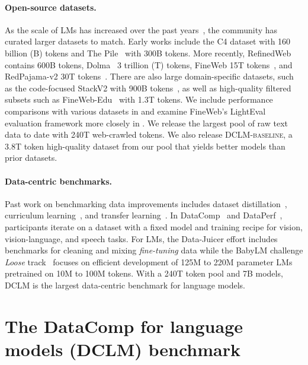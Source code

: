 \documentclass{article}
\newcommand{\smallsec}[1]{\paragraph{#1}}
\newcommand{\dclm}{\textsc{DCLM}\xspace}
\newcommand{\hqpool}{\textsc{DCLM-baseline}\xspace}
\newcommand{\numpooltokens}{240T\xspace}
\begin{document}
\smallsec{Open-source datasets.} As the scale of LMs has increased over the past years~\citep{llama,llama2,llama3,Chowdhery2022PaLMSL,chinchilla,gpt4,gopher,gemmateam2024gemma}, the community has curated larger datasets to match.
Early works include the C4 dataset with 160 billion (B) tokens and The Pile~\citep{pile} with 300B tokens.
More recently, RefinedWeb~\citep{refinedweb} contains 600B tokens, Dolma~\citep{soldaini2024dolma} 3 trillion (T) tokens, FineWeb 15T tokens~\citep{penedo2024fineweb}, and RedPajama-v2 30T tokens~\citep{rpjv2}.
There are also large domain-specific datasets, such as the code-focused StackV2 with 900B tokens~\citep{lozhkov2024starcoder}, as well as high-quality filtered subsets such as FineWeb-Edu~\citep{lozhkov2024fineweb-edu} with 1.3T tokens.
We include performance comparisons with various datasets in  and examine FineWeb's LightEval evaluation framework more closely in .
We release the largest pool of raw text data to date with \numpooltokens web-crawled tokens.
We also release \hqpool, a 3.8T token high-quality dataset from our pool that yields better models than prior datasets.

\smallsec{Data-centric benchmarks.} Past work on benchmarking data improvements includes dataset distillation~\citep{cui2022dcbench}, curriculum learning~\citep{pmlr-v139-romac21a}, and transfer learning~\citep{albalak-etal-2022-feta,pmlr-v162-bugliarello22a}. In DataComp~\citep{gadre2024datacomp} and DataPerf~\citep{dataperf}, participants iterate on a dataset with a fixed model and training recipe for vision, vision-language, and speech tasks. For LMs, the Data-Juicer \citep{datajuicer2023} effort includes benchmarks for cleaning and mixing \textit{fine-tuning} data while the BabyLM challenge \emph{Loose} track~\citep{warstadt-etal-2023-findings} focuses on efficient development of 125M to 220M parameter LMs pretrained on 10M to 100M tokens.
With a 240T token pool and 7B models, \dclm is the largest data-centric benchmark for language models.

\section{The DataComp for language models (\dclm) benchmark}\label{sec:benchmark}
\end{document}
